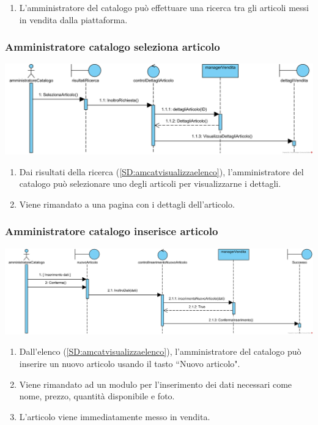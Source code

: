\documentclass[12pt]{article}
\begin{document}
\begin{enumerate}
\item L'amministratore del catalogo può effettuare una ricerca tra gli articoli messi in vendita dalla piattaforma.
\end{enumerate}

\subsubsection{Amministratore catalogo seleziona articolo}
\label{SD:amcatselezionaarticolo}
\begin{center}
\includegraphics[width=\textwidth]{SequenceDiagram/AmministratoreCatalogoVenditaSeleziona}
\end{center}

\begin{enumerate}
\item Dai risultati della ricerca (\ref{SD:amcatvisualizzaelenco}), l'amministratore del catalogo può selezionare uno degli articoli per visualizzarne i dettagli.
\item Viene rimandato a una pagina con i dettagli dell'articolo.
\end{enumerate}

\subsubsection{Amministratore catalogo inserisce articolo}
\label{SD:amcatinseriscearticolo}
\begin{center}
\includegraphics[width=\textwidth]{SequenceDiagram/AmministratoreCatalogoVenditaCrea}
\end{center}

\begin{enumerate}
\item Dall'elenco (\ref{SD:amcatvisualizzaelenco}), l'amministratore del catalogo può inserire un nuovo articolo usando il tasto ``Nuovo articolo".
\item Viene rimandato ad un modulo per l'inserimento dei dati necessari come nome, prezzo, quantità disponibile e foto.
\item L'articolo viene immediatamente messo in vendita.
\end{enumerate}
\end{document}
